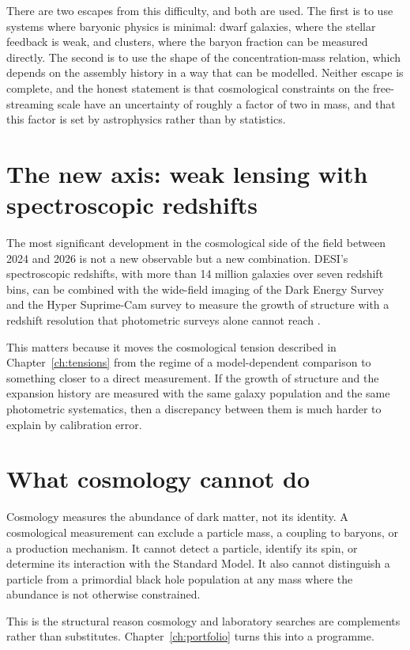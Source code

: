 There are two escapes from this difficulty, and both are used. The first is
to use systems where baryonic physics is minimal: dwarf galaxies, where the
stellar feedback is weak, and clusters, where the baryon fraction can be
measured directly. The second is to use the shape of the concentration-mass
relation, which depends on the assembly history in a way that can be
modelled. Neither escape is complete, and the honest statement is that
cosmological constraints on the free-streaming scale have an uncertainty of
roughly a factor of two in mass, and that this factor is set by astrophysics
rather than by statistics.

\section{The new axis: weak lensing with spectroscopic redshifts}The most
significant development in the cosmological side of the field between 2024
and 2026 is not a new observable but a new combination. DESI's spectroscopic
redshifts, with more than 14 million galaxies over seven redshift bins, can
be combined with the wide-field imaging of the Dark Energy Survey and the
Hyper Suprime-Cam survey to measure the growth of structure with a
redshift resolution that photometric surveys alone cannot reach
.

This matters because it moves the cosmological tension described in
Chapter~\ref{ch:tensions} from the regime of a model-dependent comparison to
something closer to a direct measurement. If the growth of structure and the
expansion history are measured with the same galaxy population and the same
photometric systematics, then a discrepancy between them is much harder to
explain by calibration error.

\section{What cosmology cannot do}Cosmology measures the abundance of dark
matter, not its identity. A cosmological measurement can exclude a particle
mass, a coupling to baryons, or a production mechanism. It cannot detect a
particle, identify its spin, or determine its interaction with the Standard
Model. It also cannot distinguish a particle from a primordial black hole
population at any mass where the abundance is not otherwise constrained.

This is the structural reason cosmology and laboratory searches are
complements rather than substitutes. Chapter~\ref{ch:portfolio} turns this
into a programme.


